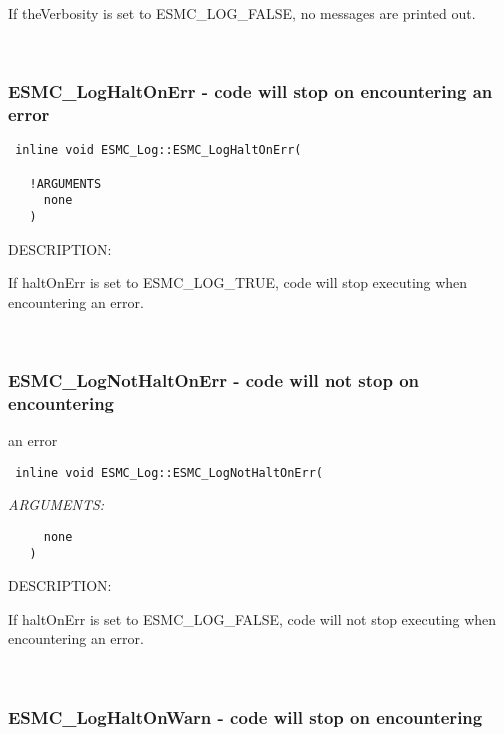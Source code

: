    If theVerbosity is set to ESMC\_LOG\_FALSE, no messages are printed out. 
    
 
\mbox{}\hrulefill\ 
 

  \subsubsection [ESMC\_LogHaltOnErr] {ESMC\_LogHaltOnErr - code will stop on encountering an error }


  
\begin{verbatim} 
 inline void ESMC_Log::ESMC_LogHaltOnErr(
 
   !ARGUMENTS
     none
   )
 \end{verbatim}
{\sf DESCRIPTION:\\ }


   If haltOnErr is set to ESMC\_LOG\_TRUE, code will stop executing when
   encountering an error.
    
 
\mbox{}\hrulefill\ 
 

  \subsubsection [ESMC\_LogNotHaltOnErr] {ESMC\_LogNotHaltOnErr - code will not stop on encountering}


   an error  
  
\begin{verbatim} 
 inline void ESMC_Log::ESMC_LogNotHaltOnErr(
 \end{verbatim}{\em ARGUMENTS:}
\begin{verbatim}     none
   )
 \end{verbatim}
{\sf DESCRIPTION:\\ }


   If haltOnErr is set to ESMC\_LOG\_FALSE, code will not stop executing when
   encountering an error.
    
 
\mbox{}\hrulefill\ 
 

  \subsubsection [ESMC\_LogHaltOnWarn] {ESMC\_LogHaltOnWarn - code will stop on encountering}



